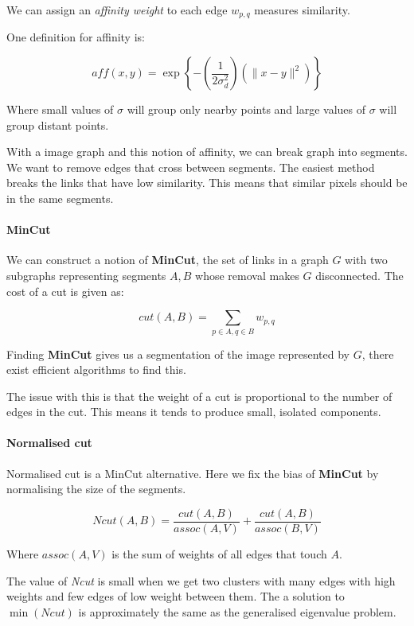 \documentclass{article}
\begin{document}
We can assign an \textit{affinity weight}  to each edge $w_{p,q}$ measures similarity.

One definition for affinity is:

\[
  \textit{aff}(x,y) = \exp\left\{-\left(\frac{1}{2\sigma^{2}_{d}}\right)(\|x-y\|^{2})\right\}
\]

Where small values of \(\sigma\) will group only nearby points and large values of \(\sigma\) will group distant points.

With a image graph and this notion of affinity, we can break graph into segments. We want to remove edges that cross between segments. The easiest method breaks the links that have low similarity. This means that similar pixels should be in the same segments.

\paragraph{MinCut}

We can construct a notion of \textbf{MinCut}, the set of links in a graph $G$ with two subgraphs representing segments $A,B$ whose removal makes $G$ disconnected. The cost of a cut is given as:

\[
  \textit{cut}(A,B) = \sum_{p\in A, q\in B} w_{p,q}
\]

Finding \textbf{MinCut}  gives us a segmentation of the image represented by $G$, there exist efficient algorithms to find this.

The issue with this is that the weight of a cut is proportional to the number of edges in the cut. This means it tends to produce small, isolated components.

\paragraph{Normalised cut}

Normalised cut is a MinCut alternative. Here we fix the bias of \textbf{MinCut} by normalising the size of the segments.

\[
  \textit{Ncut} (A,B) = \frac{\textit{cut} (A,B)}{\textit{assoc}(A,V) } + \frac{\textit{cut}(A,B) }{\textit{assoc}(B,V) }
\]

Where $\textit{assoc}(A,V) $ is the sum of weights of all edges that touch $A$.

The value of \textit{Ncut} is small when we get two clusters with many edges with high weights and few edges of low weight between them. The a solution to $\min(\textit{Ncut} )$  is approximately the same as the generalised eigenvalue problem.
\end{document}
